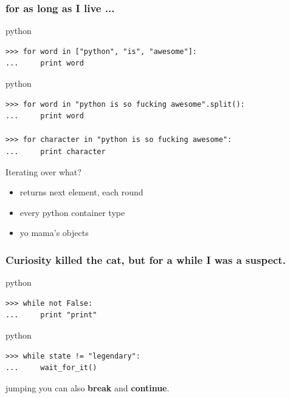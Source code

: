 \documentclass{beamer}
\begin{document}
\begin{frame}[fragile]
    \frametitle{\textbf{for} as long as I live ...}
    
    \begin{exampleblock}{python}
    \begin{lstlisting}
>>> for word in ["python", "is", "awesome"]:
...     print word
    \end{lstlisting}
    \end{exampleblock}

    \begin{exampleblock}{python}
    \begin{lstlisting}
>>> for word in "python is so fucking awesome".split():
...     print word

>>> for character in "python is so fucking awesome":
...     print character
    \end{lstlisting}
    \end{exampleblock}

	\pause

    \begin{block}{Iterating over what?}
    \begin{itemize}
    \item returns next element, each round
    \item every python container type
    \item yo mama's objects %
    \end{itemize}
    \end{block}
\end{frame}

\begin{frame}[fragile]
	\frametitle{Curiosity killed the cat, but for a \textbf{while} I was a suspect.} %

	\begin{exampleblock}{python}
	\begin{lstlisting}
>>> while not False:
...     print "print"
	\end{lstlisting}
	\end{exampleblock}
	
\pause
	
	\begin{exampleblock}{python}
	\begin{lstlisting}
>>> while state != "legendary":
...     wait_for_it()
	\end{lstlisting}
	\end{exampleblock}

\pause
	
	\begin{block}{jumping}
	you can also \textbf{break} and \textbf{continue}.
	\end{block}
\end{frame}
\end{document}
